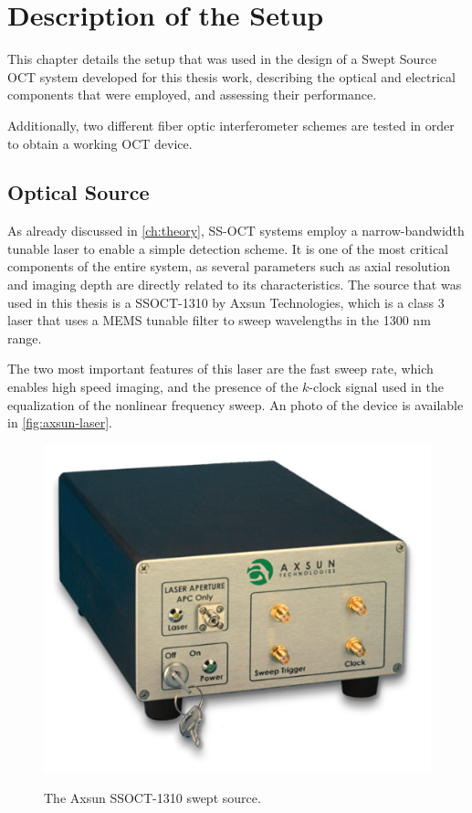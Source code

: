 
\chapter{Description of the Setup} %
\label{ch:setup} %

This chapter details the setup that was used in the design of a Swept Source OCT system developed for this thesis work, describing the optical and electrical components that were employed, and assessing their performance. 

\noindent Additionally, two different fiber optic interferometer schemes are tested in order to obtain a working OCT device. 

\section{Optical Source}
As already discussed in \autoref{ch:theory}, \ac{SS-OCT} systems employ a narrow-bandwidth tunable laser to enable a simple detection scheme. It is one of the most critical components of the entire system, as several parameters such as axial resolution and imaging depth are directly related to its characteristics. The source that was used in this thesis is a SSOCT-1310 by Axsun Technologies, which is a class 3 laser that uses a \ac{MEMS} tunable filter to sweep wavelengths in the 1300 nm range. 

The two most important features of this laser are the fast sweep rate, which enables high speed imaging, and the presence of the $k$-clock signal used in the equalization of the nonlinear frequency sweep. An photo of the device is available in \autoref{fig:axsun-laser}.

\begin{figure}[bth]
	\myfloatalign
	{\includegraphics[width=.6\linewidth]{gfx/ch3/axsun}}
	\caption{The Axsun SSOCT-1310 swept source.}\label{fig:axsun-laser}
\end{figure}

